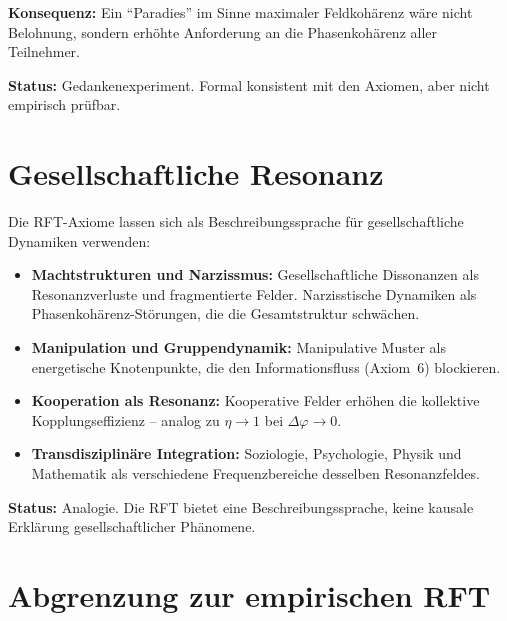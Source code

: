 \documentclass[a4paper,11pt]{article}
\begin{document}
	\textbf{Konsequenz:} Ein ``Paradies'' im Sinne maximaler
	Feldkoh\"arenz w\"are nicht Belohnung, sondern erh\"ohte
	Anforderung an die Phasenkoh\"arenz aller Teilnehmer.
	
	\textbf{Status:} Gedankenexperiment. Formal konsistent
	mit den Axiomen, aber nicht empirisch pr\"ufbar.
	
	\section{Gesellschaftliche Resonanz}
	
	Die RFT-Axiome lassen sich als Beschreibungssprache
	f\"ur gesellschaftliche Dynamiken verwenden:
	
	\begin{itemize}
		\item \textbf{Machtstrukturen und Narzissmus:}
		Gesellschaftliche Dissonanzen als Resonanzverluste
		und fragmentierte Felder. Narzisstische Dynamiken
		als Phasenkoh\"arenz-St\"orungen, die die
		Gesamtstruktur schw\"achen.
		
		\item \textbf{Manipulation und Gruppendynamik:}
		Manipulative Muster als energetische Knotenpunkte,
		die den Informationsfluss (Axiom~6) blockieren.
		
		\item \textbf{Kooperation als Resonanz:}
		Kooperative Felder erh\"ohen die kollektive
		Kopplungseffizienz -- analog zu
		$\eta \to 1$ bei $\Delta\varphi \to 0$.
		
		\item \textbf{Transdisziplin\"are Integration:}
		Soziologie, Psychologie, Physik und Mathematik
		als verschiedene Frequenzbereiche desselben
		Resonanzfeldes.
	\end{itemize}
	
	\textbf{Status:} Analogie. Die RFT bietet eine
	Beschreibungssprache, keine kausale Erkl\"arung
	gesellschaftlicher Ph\"anomene.
	
	\section{Abgrenzung zur empirischen RFT}
	
\end{document}
